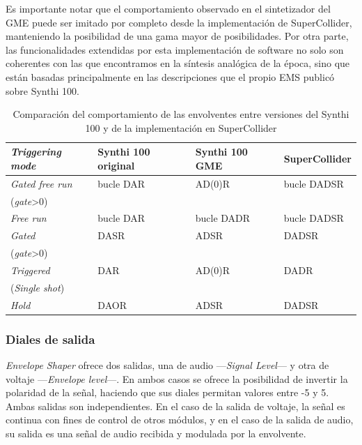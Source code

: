 Es importante notar que el comportamiento observado en el sintetizador del GME puede ser imitado por completo desde la implementación de SuperCollider, manteniendo la posibilidad de una gama mayor de posibilidades. Por otra parte, las funcionalidades extendidas por esta implementación de software no solo son coherentes con las que encontramos en la síntesis analógica de la época, sino que están basadas principalmente en las descripciones que el propio EMS publicó sobre Synthi 100.



\begin{table}
	\begin{center}
		\begin{tabular}{ llll }
			\textit{Triggering mode}	& Synthi 100 original	& Synthi 100 GME	& SuperCollider\\
			\hline
			\textit{Gated free run} 	& bucle DAR 		 	& AD(0)R			& bucle DADSR\\
			(\textit{gate}>0)\\ 
			\textit{Free run}			& bucle DAR				& bucle DADR		& bucle DADSR\\
			\textit{Gated}				& DASR					& ADSR				& DADSR\\
			(\textit{gate}>0)\\ 
			\textit{Triggered}			& DAR					& AD(0)R			& DADR\\
			(\textit{Single shot})\\
			\textit{Hold}				& DAOR					& ADSR				& DADSR\\
			
		\end{tabular}
		\caption[Comparación de envolventes del Synthi 100]{Comparación del comportamiento de las envolventes entre versiones del Synthi 100 y de la implementación en SuperCollider}
		\label{table:envolventes}
	\end{center}
\end{table}

\subsubsection{Diales de salida}

\textit{Envelope Shaper} ofrece dos salidas, una de audio ---\textit{Signal Level}--- y otra de voltaje ---\textit{Envelope level}---. En ambos casos se ofrece la posibilidad de invertir la polaridad de la señal, haciendo que sus diales permitan valores entre -5 y 5. Ambas salidas son independientes. En el caso de la salida de voltaje, la señal es continua con fines de control de otros módulos, y en el caso de la salida de audio, su salida es una señal de audio recibida y modulada por la envolvente.
